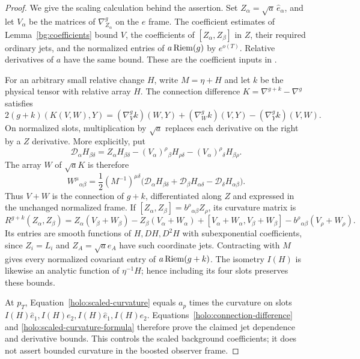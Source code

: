 \begin{proof}
We give the scaling calculation behind the assertion.  Set
$Z_\alpha=\sqrt a\,\hat e_\alpha$, and let $V_\alpha$ be the
matrices of $\nabla^g_{Z_\alpha}$ on the $\hat e$ frame.  The
coefficient estimates of Lemma~\ref{bg:coefficients} bound $V$,
the coefficients of $[Z_\alpha,Z_\beta]$ in $Z$, their required
ordinary jets, and the normalized entries of $a\operatorname{Riem}(g)$ by
$e^{o(T)}$.  Relative derivatives of $a$ have the same bound.
These are the coefficient inputs in \cite[]{Foundation}.

For an arbitrary small relative change $H$, write $M=\eta+H$ and
let $k$ be the physical tensor with relative array $H$.
The connection difference $K=\nabla^{g+k}-\nabla^g$ satisfies
\[
 2(g+k)(K(V,W),Y)
    =(\nabla^g_Vk)(W,Y)+(\nabla^g_Wk)(V,Y)
                              -(\nabla^g_Yk)(V,W).
\]
On normalized slots, multiplication by $\sqrt a$ replaces each
derivative on the right by a $Z$ derivative.  More explicitly, put
\[
 \mathcal D_\alpha H_{\beta\delta}
   =Z_\alpha H_{\beta\delta}
      -(V_\alpha)^\rho{}_{\beta}H_{\rho\delta}
      -(V_\alpha)^\rho{}_{\delta}H_{\beta\rho}.
\]
The array $W$ of $\sqrt a K$ is therefore
\begin{equation}\label{holo:connection-difference}
 W^\mu{}_{\alpha\beta}
   =\frac12(M^{-1})^{\mu\delta}
      \bigl(\mathcal D_\alpha H_{\beta\delta}
          +\mathcal D_\beta H_{\alpha\delta}
          -\mathcal D_\delta H_{\alpha\beta}\bigr).
\end{equation}
Thus $V+W$ is the connection of $g+k$, differentiated along $Z$
and expressed in the unchanged normalized frame.  If
$[Z_\alpha,Z_\beta]=b^\rho{}_{\alpha\beta}Z_\rho$, its curvature
matrix is
\begin{equation}\label{holo:scaled-curvature-formula}
 R^{g+k}(Z_\alpha,Z_\beta)
  =Z_\alpha(V_\beta+W_\beta)-Z_\beta(V_\alpha+W_\alpha)
   +[V_\alpha+W_\alpha,V_\beta+W_\beta]
   -b^\rho{}_{\alpha\beta}(V_\rho+W_\rho).
\end{equation}
Its entries are smooth functions of $H,DH,D^2H$ with
subexponential coefficients, since $Z_i=L_i$ and $Z_A=\sqrt a e_A$
have such coordinate jets.  Contracting with $M$ gives every
normalized covariant entry of $a\operatorname{Riem}(g+k)$.  The isometry $I(H)$
is likewise an analytic function of $\eta^{-1}H$; hence including
its four slots preserves these bounds.

At $p_T$, Equation~\eqref{holo:scaled-curvature} equals $a_p$
times the curvature on slots
$I(H)\hat e_1,I(H)e_2,I(H)\hat e_1,I(H)e_2$.
Equations~\eqref{holo:connection-difference} and
\eqref{holo:scaled-curvature-formula} therefore prove the claimed
jet dependence and derivative bounds.  This controls the scaled
background coefficients; it does not assert bounded curvature in
the boosted observer frame.


\end{proof}
